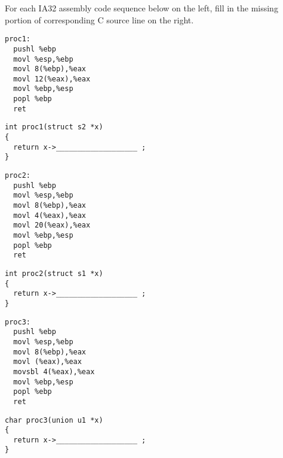 \newpage
\begin{problem}{12}
For each IA32 assembly code sequence below on the left, fill in the missing
portion of corresponding C source line on the right.

\begin{choice}
\item
\begin{minipage}[t]{2.3in}
\begin{verbatim}
proc1:
  pushl %ebp
  movl %esp,%ebp
  movl 8(%ebp),%eax
  movl 12(%eax),%eax
  movl %ebp,%esp
  popl %ebp
  ret
\end{verbatim}
\end{minipage}
%
\hspace{0.1in}
%
\begin{minipage}[t]{3.3in}
\begin{verbatim}
int proc1(struct s2 *x)
{
  return x->___________________ ;
}
\end{verbatim}
\end{minipage}

\item
\begin{minipage}[t]{2.3in}
\begin{verbatim}
proc2:
  pushl %ebp
  movl %esp,%ebp
  movl 8(%ebp),%eax
  movl 4(%eax),%eax
  movl 20(%eax),%eax
  movl %ebp,%esp
  popl %ebp
  ret
\end{verbatim}
\end{minipage}
%
\hspace{0.1in}
%
\begin{minipage}[t]{3.3in}
\begin{verbatim}
int proc2(struct s1 *x)
{
  return x->___________________ ;
}
\end{verbatim}
\end{minipage}

\item
\begin{minipage}[t]{2.3in}
\begin{verbatim}
proc3:
  pushl %ebp
  movl %esp,%ebp
  movl 8(%ebp),%eax
  movl (%eax),%eax
  movsbl 4(%eax),%eax
  movl %ebp,%esp
  popl %ebp
  ret
\end{verbatim}
\end{minipage}
%
\hspace{0.1in}
%
\begin{minipage}[t]{3.3in}
\begin{verbatim}
char proc3(union u1 *x)
{
  return x->___________________ ;
}
\end{verbatim}
\end{minipage}


\end{choice}
\end{problem}
